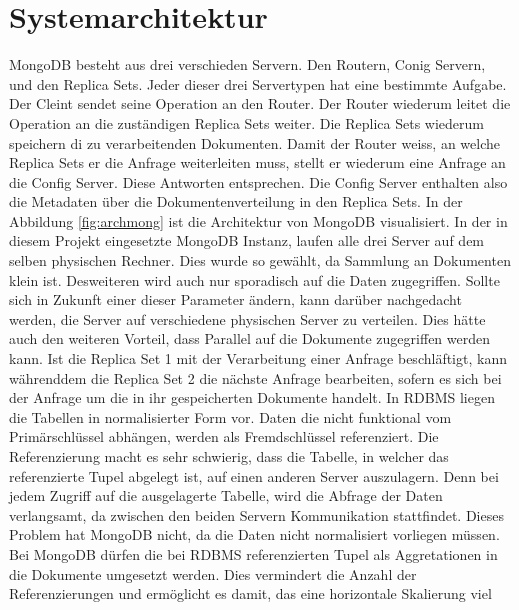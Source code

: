  \section{Systemarchitektur}
 MongoDB besteht aus drei verschieden Servern. Den Routern, Conig Servern, und
 den Replica Sets. Jeder dieser drei Servertypen hat eine bestimmte Aufgabe.
 Der Cleint sendet seine Operation an den Router. Der Router wiederum leitet
 die Operation an die zuständigen Replica Sets weiter. Die Replica Sets wiederum 
 speichern di zu verarbeitenden Dokumenten. Damit der Router weiss, an welche
 Replica Sets er die Anfrage weiterleiten muss, stellt er wiederum eine Anfrage
 an die Config Server. Diese Antworten entsprechen. Die Config Server enthalten 
 also die Metadaten über die Dokumentenverteilung in den Replica Sets.
 In der Abbildung \ref{fig:archmong} ist die Architektur von MongoDB
 visualisiert.
 In der in diesem Projekt eingesetzte MongoDB Instanz, laufen alle drei Server
 auf dem selben physischen Rechner. Dies wurde so gewählt, da Sammlung an
 Dokumenten klein ist. Desweiteren wird auch nur sporadisch auf die Daten
 zugegriffen. Sollte sich in Zukunft einer dieser Parameter ändern, kann darüber
 nachgedacht werden, die Server auf verschiedene physischen Server zu
 verteilen. Dies hätte auch den weiteren Vorteil, dass Parallel auf die
 Dokumente zugegriffen werden kann. Ist die Replica Set 1 mit der Verarbeitung
 einer Anfrage beschläftigt, kann währenddem die Replica Set 2 die nächste
 Anfrage bearbeiten, sofern es sich bei der Anfrage um die in ihr gespeicherten
 Dokumente handelt.
 In RDBMS liegen die Tabellen in normalisierter Form vor. Daten die nicht
 funktional vom Primärschlüssel abhängen, werden als Fremdschlüssel
 referenziert. Die Referenzierung macht es sehr schwierig, dass die Tabelle, in
 welcher das referenzierte Tupel abgelegt ist, auf einen anderen Server
 auszulagern. Denn bei jedem Zugriff auf die ausgelagerte Tabelle, wird die
 Abfrage der Daten verlangsamt, da zwischen den beiden Servern Kommunikation
 stattfindet. Dieses Problem hat MongoDB nicht, da die Daten nicht normalisiert
 vorliegen müssen. Bei MongoDB dürfen die bei RDBMS referenzierten Tupel als
 Aggretationen in die Dokumente umgesetzt werden. Dies vermindert die Anzahl der
 Referenzierungen und ermöglicht es damit, das eine horizontale Skalierung viel
